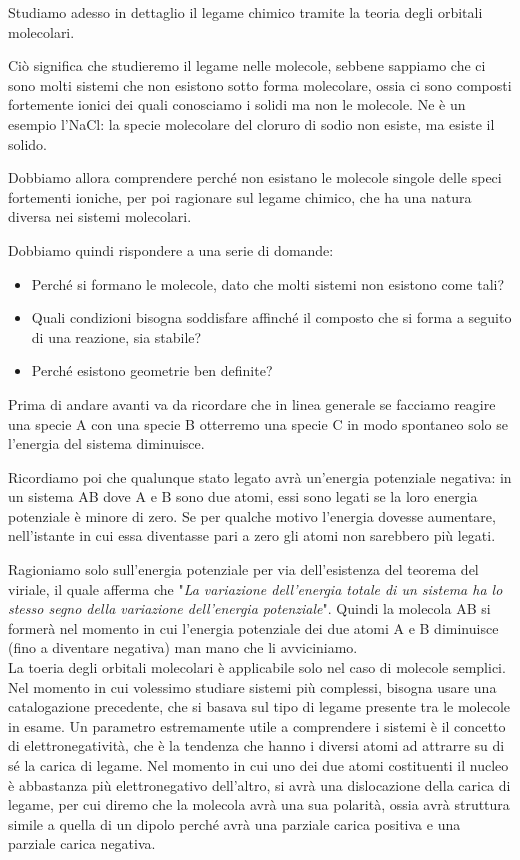 Studiamo adesso in dettaglio il legame chimico tramite la teoria degli orbitali molecolari.

Ciò significa che studieremo il legame nelle molecole, sebbene sappiamo che ci sono molti sistemi che non esistono sotto forma molecolare, ossia ci sono composti fortemente ionici dei quali conosciamo i solidi ma non le molecole. Ne è un esempio l'NaCl: la specie molecolare del cloruro di sodio non esiste, ma esiste il solido.

Dobbiamo allora comprendere perché non esistano le molecole singole delle speci fortementi ioniche, per poi ragionare sul legame chimico, che ha una natura diversa nei sistemi molecolari.

Dobbiamo quindi rispondere a una serie di domande:
\begin{itemize}
    \item Perché si formano le molecole, dato che molti sistemi non esistono come tali?
    \item Quali condizioni bisogna soddisfare affinché il composto che si forma a seguito di una reazione, sia stabile?
    \item Perché esistono geometrie ben definite?
\end{itemize}
Prima di andare avanti va da ricordare che in linea generale se facciamo reagire una specie A con una specie B otterremo una specie C in modo spontaneo solo se l'energia del sistema diminuisce. 

Ricordiamo poi che qualunque stato legato avrà un'energia potenziale negativa: in un sistema AB dove A e B sono due atomi, essi sono legati se la loro energia potenziale è minore di zero. Se per qualche motivo l'energia dovesse aumentare, nell'istante in cui essa diventasse pari a zero gli atomi non sarebbero più legati.

Ragioniamo solo sull'energia potenziale per via dell'esistenza del teorema del viriale, il quale afferma che "\textit{La variazione dell'energia totale di un sistema ha lo stesso segno della variazione dell'energia potenziale}". Quindi la molecola AB si formerà nel momento in cui l'energia potenziale dei due atomi A e B diminuisce (fino a diventare negativa) man mano che li avviciniamo.\\

La toeria degli orbitali molecolari è applicabile solo nel caso di molecole semplici. Nel momento in cui volessimo studiare sistemi più complessi, bisogna usare una catalogazione precedente, che si basava sul tipo di legame presente tra le molecole in esame.
Un parametro estremamente utile a comprendere i sistemi è il concetto di elettronegatività, che è la tendenza che hanno i diversi atomi ad attrarre su di sé la carica di legame. Nel momento in cui uno dei due atomi costituenti il nucleo è abbastanza più elettronegativo dell'altro, si avrà una dislocazione della carica di legame, per cui diremo che la molecola avrà una sua polarità, ossia avrà struttura simile a quella di un dipolo perché avrà una parziale carica positiva e una parziale carica negativa.

